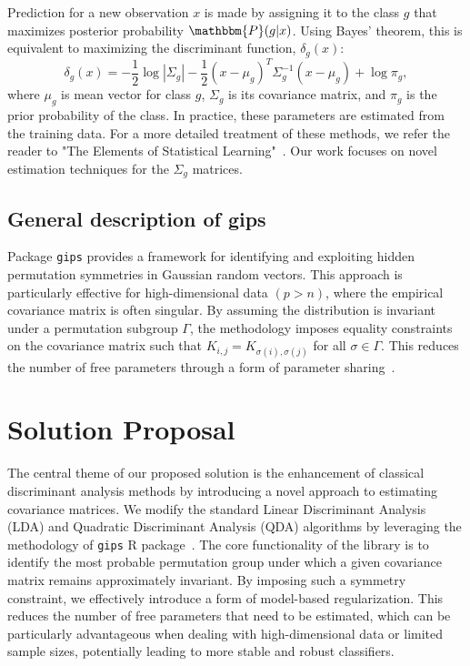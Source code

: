 \documentclass[a4paper,11pt,twoside]{report}
\theoremstyle{definition}
\begin{document}
Prediction for a new observation $x$ is made by assigning it to the class $g$ that maximizes posterior probability $\mathbbm{P}(g|x)$. Using Bayes' theorem, this is equivalent to maximizing the discriminant function, $\delta_g(x)$:
\begin{equation}
    \delta_g(x) = -\frac{1}{2} \log |\Sigma_g| - \frac{1}{2} (x - \mu_g)^T \Sigma_g^{-1} (x - \mu_g) + \log \pi_g,
\end{equation}
where $\mu_g$ is mean vector for class $g$, $\Sigma_g$ is its covariance matrix, and $\pi_g$ is the prior probability of the class. In practice, these parameters are estimated from the training data. For a more detailed treatment of these methods, we refer the reader to "The Elements of Statistical Learning"~\cite{elemstats}. Our work focuses on novel estimation techniques for the $\Sigma_g$ matrices.


\section{General description of gips}
Package \texttt{gips} provides a framework for identifying and
exploiting hidden permutation symmetries in Gaussian random vectors.
This approach is particularly effective for high-dimensional data $(p>n)$,
where the empirical covariance matrix is often singular. By assuming
the distribution is invariant under a permutation subgroup $\Gamma$,
the methodology imposes equality constraints on the covariance matrix such that
$K_{i,j} = K_{\sigma(i), \sigma(j)}$ for all $\sigma \in \Gamma$. This reduces the number of free parameters through a form of parameter sharing~\cite{JSSv112i07}.





\chapter{Solution Proposal}
The central theme of our proposed solution is the enhancement of classical discriminant analysis methods by introducing a novel approach to estimating covariance matrices.
We modify the standard Linear Discriminant Analysis (LDA) and Quadratic Discriminant Analysis (QDA) algorithms by leveraging the methodology of \texttt{gips} R package~\cite{JSSv112i07}.
The core functionality of the library is to identify the most probable permutation group under which a given covariance matrix remains approximately invariant.
By imposing such a symmetry constraint, we effectively introduce a form of model-based regularization.
This reduces the number of free parameters that need to be estimated, which can be particularly advantageous when dealing with high-dimensional data or limited sample sizes, potentially leading to more stable and robust classifiers.
\end{document}
